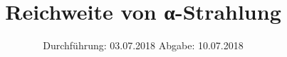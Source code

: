 

\subject{Versuch 701}
\title{Reichweite von α-Strahlung}
\date{%
  Durchführung: 03.07.2018
  \hspace{3em}
  Abgabe: 10.07.2018
}



\maketitle
\thispagestyle{empty}
\tableofcontents
\newpage






\printbibliography{}


